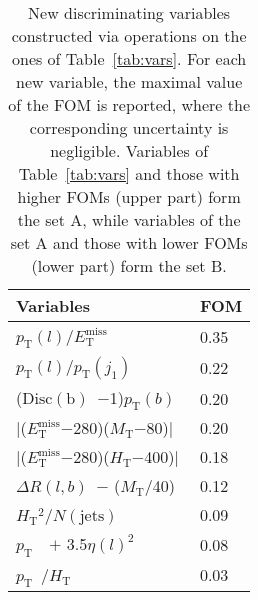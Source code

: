\documentclass{article}
\newcommand{\pt}{\ensuremath{p_{\mathrm{T}}}~}
\newcommand{\ptl}{\ensuremath{p_{\mathrm{T}}(l)}}
\newcommand{\met}{\ensuremath{E_\mathrm{T}^\mathrm{miss}}}
\newcommand{\mt}{\ensuremath{M_{\mathrm{T}}}}
\newcommand{\Ht}{\ensuremath{H_{\mathrm{T}}}}
\newcommand{\jeti}[1]{\ensuremath{j_{#1}}}
\newcommand{\ptisr}{\ensuremath{p_{\mathrm{T}}(\jeti{1})}~}
\newcommand{\njet}{\ensuremath{N(\mathrm{jets})}~}
\newcommand{\ptb}{\ensuremath{p_{\mathrm{T}}(b)}~}
\newcommand{\bdisc}{\ensuremath{\mathrm{Disc(b)}}~}
\newcommand{\drLB}{\ensuremath{\Delta R (l, b)}~}
\begin{document}
\begin{table}[!htbp]
\begin{center}  
\begin{tabular}{|l|l|}
\hline
\hline
Variables & FOM \\
\hline
\ptl/\met & 0.35 \\
\ptl/\ptisr & 0.22 \\
(\bdisc$-$1)\ptb & 0.20 \\
$|$(\met$-$280)(\mt$-$80)$|$ & 0.20 \\
$|$(\met$-$280)(\Ht$-$400)$|$ & 0.18 \\
\hline
\drLB$-$ (\mt/40) & 0.12 \\
\Ht$^2$/\njet & 0.09 \\
\pt~$+$ 3.5$\eta(l)^2$ & 0.08 \\
\pt/\Ht & 0.03 \\
\hline
\hline
\end{tabular}
\caption{New discriminating variables constructed via operations on
  the ones of Table~\ref{tab:vars}. For each new variable, the maximal
  value of the FOM is reported, where the corresponding uncertainty is
  negligible. Variables of Table~\ref{tab:vars} and those with higher
  FOMs (upper part) form the set A, while variables of the set A
  and those with lower FOMs (lower part) form the set B.}
\label{tab:varnew}
\end{center}
\end{table}
\end{document}
